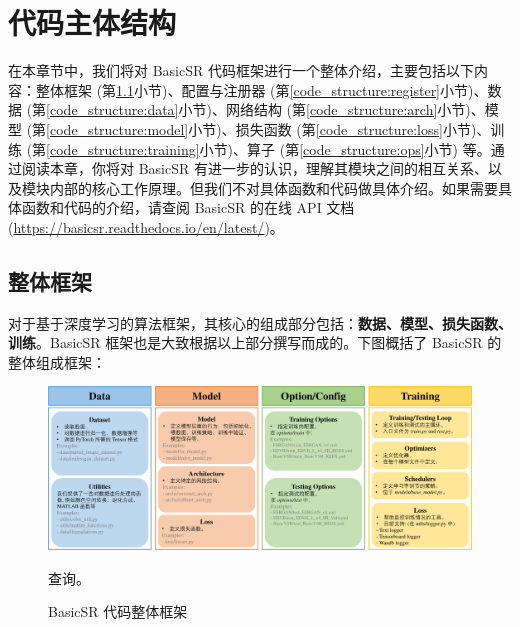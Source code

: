 \documentclass[../main.tex]{subfiles}
\begin{document}
\chapter{代码主体结构}
\vspace{-2cm}

在本章节中，我们将对 BasicSR 代码框架进行一个整体介绍，主要包括以下内容：整体框架 (第\ref{code_structure:overview}小节)、配置与注册器 (第\ref{code_structure:register}小节)、数据 (第\ref{code_structure:data}小节)、网络结构 (第\ref{code_structure:arch}小节)、模型 (第\ref{code_structure:model}小节)、损失函数 (第\ref{code_structure:loss}小节)、训练 (第\ref{code_structure:training}小节)、算子 (第\ref{code_structure:ops}小节) 等。通过阅读本章，你将对 BasicSR 有进一步的认识，理解其模块之间的相互关系、以及模块内部的核心工作原理。但我们不对具体函数和代码做具体介绍。如果需要具体函数和代码的介绍，请查阅 BasicSR 的在线 API 文档 (\url{https://basicsr.readthedocs.io/en/latest/})。

\section{整体框架} \label{code_structure:overview}
对于基于深度学习的算法框架，其核心的组成部分包括：\textbf{数据、模型、损失函数、训练}。BasicSR 框架也是大致根据以上部分撰写而成的。下图概括了 BasicSR 的整体组成框架：

\begin{figure}[htbp]
    \begin{center}
        \includegraphics[width=1\linewidth]{figures/main_framework.pdf}
    \end{center}
    \caption{BasicSR 代码整体框架}
    \label{fig:main_framework}查询。
\end{figure}
\end{document}
